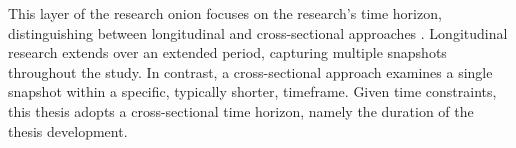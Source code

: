 This layer of the research onion focuses on the research's time horizon, distinguishing between longitudinal and cross-sectional approaches \cite{SaundersMark2023}.
Longitudinal research extends over an extended period, capturing multiple snapshots throughout the study.
In contrast, a cross-sectional approach examines a single snapshot within a specific, typically shorter, timeframe.
Given time constraints, this thesis adopts a cross-sectional time horizon, namely the duration of the thesis development.
